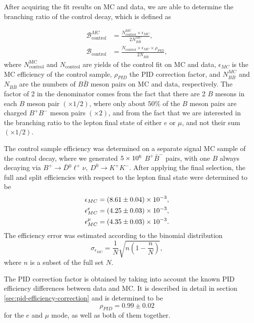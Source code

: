 After acquiring the fit results on MC and data, we are able to determine the branching ratio of the control decay, which is defined as

\begin{align}
\mathcal{B}^{MC}_{\mathrm{control}} &= \frac{N^{\mathrm{MC}}_\mathrm{control} \times \epsilon_{MC}}{2N_{B\bar B}^{MC}},\\
\mathcal{B}_{\mathrm{control}} &= \frac{N_\mathrm{control} \times \epsilon_{MC} \times \rho_{PID}}{2N_{B\bar B}},
\label{eq:br_data}
\end{align}
where $N^{\mathrm{MC}}_\mathrm{control}$ and $N_\mathrm{control}$ are yields of the control fit on MC and data, $\epsilon_{MC}$ is the MC efficiency of the control sample, $\rho_{PID}$ the PID correction factor, and $N_{B\bar B}^{MC}$ and $N_{B\bar B}$ are the numbers of $B \bar B$ meson pairs on MC and data, respectively. The factor of 2 in the denominator comes from the fact that there are 2 $B$ mesons in each $B$ meson pair $(\times 1/2)$, where only about $50\%$ of the $B$ meson pairs are charged $B^+B^-$ meson pairs $(\times 2)$, and from the fact that we are interested in the branching ratio to the lepton final state of either $e$ or $\mu$, and not their sum $(\times 1/2)$.

The control sample efficiency was determined on a separate signal MC sample of the control decay, where we generated $5\times 10^{6}$ $B^+ \bar B^-$ pairs, with one $B$ always decaying via $B^+ \to \bar D {}^0 \ell^+ \nu,~D^0 \to K^+K^-$. After applying the final selection, the full and split efficiencies with respect to the lepton final state were determined to be 
\begin{align*}
\epsilon_{MC} &= (8.61\pm 0.04)\times 10^{-3},\\
\epsilon_{MC}^e &= (4.25\pm 0.03)\times 10^{-3},\\
\epsilon_{MC}^\mu &= (4.35\pm 0.03)\times 10^{-3}.
\end{align*}
The efficiency error was estimated according to the binomial distribution
\begin{equation*}
\sigma_{\epsilon_{MC}} = \frac{1}{N}\sqrt{n(1-\frac{n}{N})},
\end{equation*}
where $n$ is a subset of the full set $N$.

The PID correction factor is obtained by taking into account the known PID efficiency differences between data and MC. It is described in detail in section \ref{sec:pid-efficiency-correction} and is determined to be
\begin{equation*}
\rho_{PID} = 0.99\pm 0.02
\end{equation*}
for the $e$ and $\mu$ mode, as well as both of them together.

